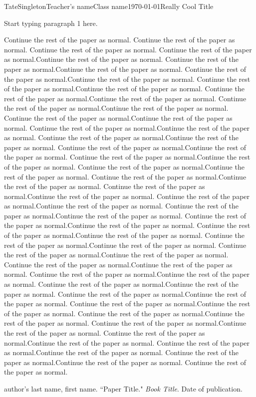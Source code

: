 \documentclass[12pt,letterpaper]{article}
\begin{document}
\begin{mla}{Tate}{Singleton}{Teacher's name}{Class name}{\today}{Really Cool Title}

Start typing paragraph 1 here.

Continue the rest of the paper as normal. Continue the rest of the paper as normal. Continue the rest of the paper as normal. Continue the rest of the paper as normal.Continue the rest of the paper as normal. Continue the rest of the paper as normal.Continue the rest of the paper as normal. Continue the rest of the paper as normal.Continue the rest of the paper as normal. Continue the rest of the paper as normal.Continue the rest of the paper as normal. Continue the rest of the paper as normal.Continue the rest of the paper as normal. Continue the rest of the paper as normal.Continue the rest of the paper as normal. Continue the rest of the paper as normal.Continue the rest of the paper as normal. Continue the rest of the paper as normal.Continue the rest of the paper as normal. Continue the rest of the paper as normal.Continue the rest of the paper as normal. Continue the rest of the paper as normal.Continue the rest of the paper as normal. Continue the rest of the paper as normal.Continue the rest of the paper as normal. Continue the rest of the paper as normal.Continue the rest of the paper as normal. Continue the rest of the paper as normal.Continue the rest of the paper as normal. Continue the rest of the paper as normal.Continue the rest of the paper as normal. Continue the rest of the paper as normal.Continue the rest of the paper as normal. Continue the rest of the paper as normal.Continue the rest of the paper as normal. Continue the rest of the paper as normal.Continue the rest of the paper as normal. Continue the rest of the paper as normal.Continue the rest of the paper as normal. Continue the rest of the paper as normal.Continue the rest of the paper as normal. Continue the rest of the paper as normal.Continue the rest of the paper as normal. Continue the rest of the paper as normal.Continue the rest of the paper as normal. Continue the rest of the paper as normal.Continue the rest of the paper as normal. Continue the rest of the paper as normal.Continue the rest of the paper as normal. Continue the rest of the paper as normal.Continue the rest of the paper as normal. Continue the rest of the paper as normal.Continue the rest of the paper as normal. Continue the rest of the paper as normal.Continue the rest of the paper as normal. Continue the rest of the paper as normal.Continue the rest of the paper as normal. Continue the rest of the paper as normal.Continue the rest of the paper as normal. Continue the rest of the paper as normal.Continue the rest of the paper as normal. Continue the rest of the paper as normal.Continue the rest of the paper as normal. Continue the rest of the paper as normal.

\begin{workscited}

\bibent
author's last name, first name.  ``Paper Title."  \textit{Book Title}.  Date of publication.

\end{workscited}
\end{mla}
\end{document}
